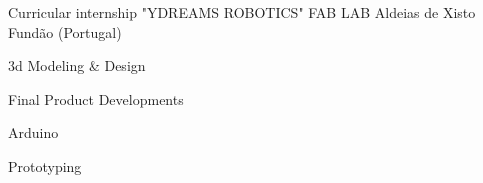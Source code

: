 \begin{cventries}
  \cventry    
    {Curricular internship} %
    {"YDREAMS ROBOTICS" FAB LAB Aldeias de Xisto} %
    {Fundão (Portugal)} %
    {} %
    {
      \begin{cvitems} %
      	\item {3d Modeling \& Design}
		\item {Final Product Developments}
		\item {Arduino}
		\item {Prototyping}
      \end{cvitems}
    }  
    
     
\end{cventries}
